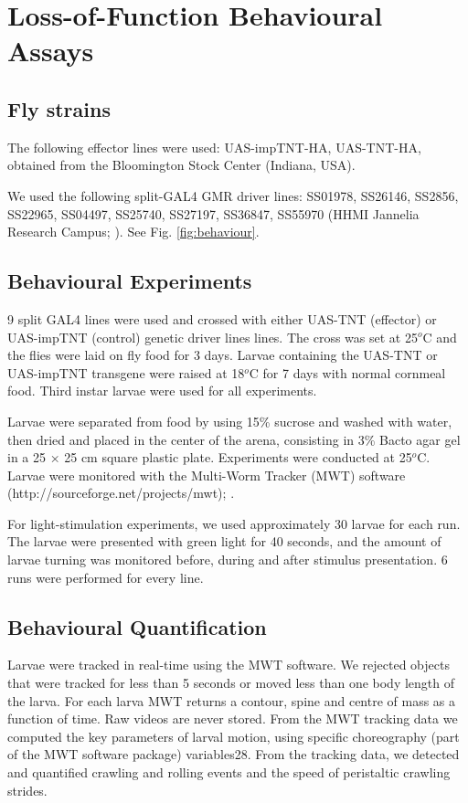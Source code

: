 
\section{Loss-of-Function Behavioural Assays}

    \subsection{Fly strains}
    The following effector lines were used: UAS-impTNT-HA, UAS-TNT-HA, obtained from the Bloomington Stock Center (Indiana, USA).

    We used the following split-GAL4 GMR driver lines: SS01978, SS26146, SS2856, SS22965, SS04497, SS25740, SS27197, SS36847, SS55970 (HHMI Jannelia Research Campus; \citep{li2014gal4, meissner2025splitgal4}). See Fig. \ref{fig:behaviour}.
    

\subsection{Behavioural Experiments}

    9 split GAL4 lines were used and crossed with either UAS-TNT (effector) or UAS-impTNT (control) genetic driver lines lines.
    The cross was set at 25$^o$C and the flies were laid on fly food for 3 days.
    Larvae containing the UAS-TNT or UAS-impTNT transgene were raised at 18$^o$C for 7 days with normal cornmeal food.
    Third instar larvae were used for all experiments.

    Larvae were separated from food by using 15\% sucrose and washed with water, then dried and placed in the center of the arena, consisting in 3\% Bacto agar gel in a 25 × 25 cm square plastic plate.
    Experiments were conducted at 25$^o$C.
    Larvae were monitored with the Multi-Worm Tracker (MWT) software (http://sourceforge.net/projects/mwt); \citep{Ohyama2013PlosONE}.

    For light-stimulation experiments, we used approximately 30 larvae for each run. The larvae were presented with green light for 40 seconds, and the amount of larvae turning was monitored before, during and after stimulus presentation. 6 runs were performed for every line.


\subsection{Behavioural Quantification}
Larvae were tracked in real-time using the MWT software. We rejected objects that were tracked for less than 5 seconds or moved less than one body length of the larva. For each larva MWT returns a contour, spine and centre of mass as a function of time. Raw videos are never stored. From the MWT tracking data we computed the key parameters of larval motion, using specific choreography (part of the MWT software package) variables28. From the tracking data, we detected and quantified crawling and rolling events and the speed of peristaltic crawling strides.%

